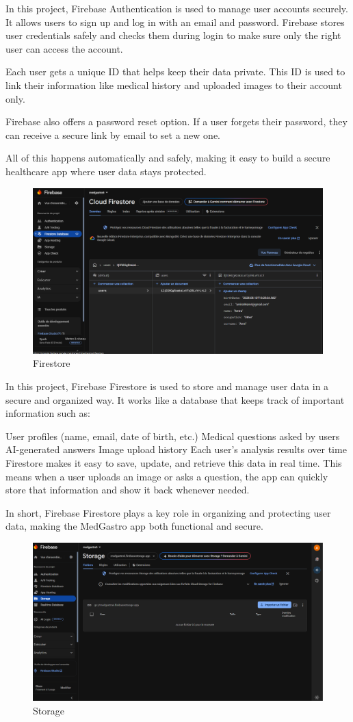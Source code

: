 \documentclass[12pt,a4paper]{report}
\begin{document}
In this project, Firebase Authentication is used to manage user accounts securely. It allows users to sign up and log in with an email and password. Firebase stores user credentials safely and checks them during login to make sure only the right user can access the account.

Each user gets a unique ID that helps keep their data private. This ID is used to link their information  like medical history and uploaded images to their account only.

Firebase also offers a password reset option. If a user forgets their password, they can receive a secure link by email to set a new one.

All of this happens automatically and safely, making it easy to build a secure healthcare app where user data stays protected.

\begin{figure}[H]
    \centering
    \includegraphics[width=0.6\linewidth]{Firestore.png}
    \caption{Firestore}
    \label{fig:enter-label}
\end{figure}

In this project, Firebase Firestore is used to store and manage user data in a secure and organized way. It works like a database that keeps track of important information such as:

User profiles (name, email, date of birth, etc.)
Medical questions asked by users
AI-generated answers
Image upload history
Each user's analysis results over time
Firestore makes it easy to save, update, and retrieve this data in real time. This means when a user uploads an image or asks a question, the app can quickly store that information and show it back whenever needed.

In short, Firebase Firestore plays a key role in organizing and protecting user data, making the MedGastro app both functional and secure.

\begin{figure}[H]
    \centering
    \includegraphics[width=0.5\linewidth]{storage.png}
    \caption{Storage}
    \label{fig:enter-label}
\end{figure}
\end{document}
